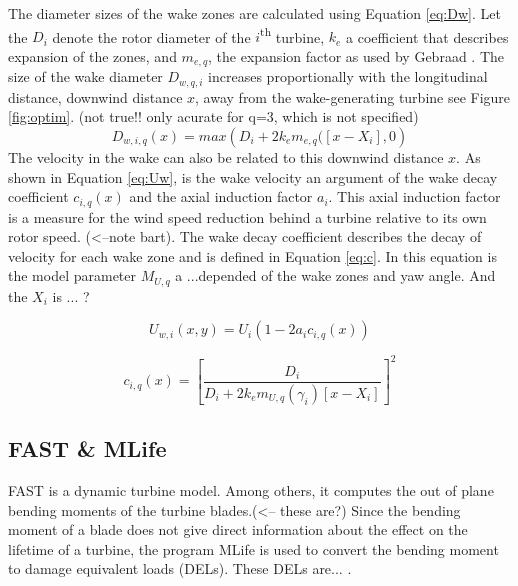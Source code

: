 The diameter sizes of the wake zones are calculated using Equation \ref{eq:Dw}. Let the $D_i$ denote the rotor diameter of the $i${\textsuperscript{th}} turbine, $k_e$ a coefficient that describes expansion of the zones, and $m_{e,q}$, the expansion factor as used by Gebraad \cite{Gebraad2016}. The size of the wake diameter $D_{w,q,i}$ increases proportionally with the longitudinal distance, downwind distance $x$, away from the wake-generating turbine see Figure \ref{fig:optim}.   (not true!! only acurate for q=3, which is not specified)
\begin{equation}
\label{eq:Dw}
D_{w,i,q}(x) = max({D_i + 2k_em_{e,q}([x - X_i],0} )
\end{equation}
The velocity in the wake can also be related to this downwind distance $x$. As shown in Equation \ref{eq:Uw}, is the wake velocity an argument of the wake decay coefficient $c_{i,q}(x)$ and the axial induction factor $a_i$. This axial induction factor is a measure for the wind speed reduction behind a turbine relative to its own rotor speed. (<--note bart). The wake decay coefficient describes the decay of velocity for each wake zone and is defined in Equation \ref{eq:c}. In this equation is the model parameter $M_{U,q}$ a ...depended of the wake zones and yaw angle\cite{Gebraad2016}. And the $X_i$ is ... ?

\begin{equation}
\label{eq:Uw}
U_{w,i}(x,y) = U_i\left( {1-2a_{i}c_{i,q}(x)} \right)
\end{equation} 

\begin{equation}
\label{eq:c}
c_{i,q}(x) = \left[ \frac{D_i}{D_i + 2k_em_{U,q}(\gamma_i)[x - X_i]} \right]^2
\end{equation}



\subsection{FAST \& MLife} FAST is a dynamic turbine model\cite{Jonkman2005}. Among others, it computes the out of plane bending moments of the turbine blades.(<-- these are?) Since the bending moment of a blade does not give direct information about the effect on the lifetime of a turbine, the program MLife is used to convert the bending moment to damage equivalent loads (DELs). These DELs are... \cite{Mlife}.


